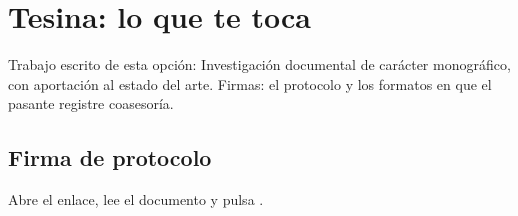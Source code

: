 \section{Tesina: lo que te toca}
Trabajo escrito de esta opción: Investigación documental de carácter monográfico, con aportación al estado del arte. Firmas: el protocolo y los formatos en que el pasante registre coasesoría.
\subsection{Firma de protocolo}
Abre el enlace, lee el documento y pulsa .

